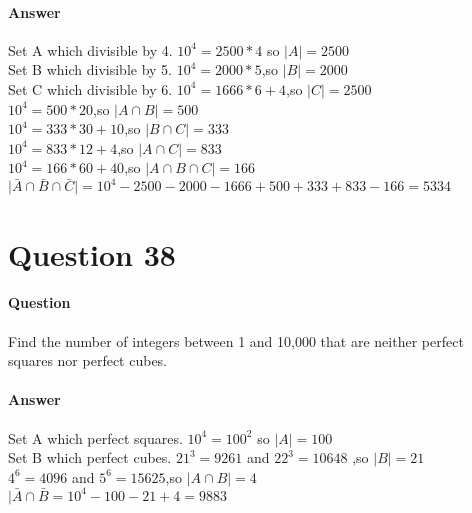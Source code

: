 \documentclass[UTF8]{article}
\begin{document}
\paragraph{Answer}
Set A which divisible by 4. $10^{4} = 2500 * 4 $ so $\vert A \vert = 2500$ \\
Set B which divisible by 5. $10^{4} = 2000 * 5 $,so $\vert B \vert = 2000$ \\
Set C which divisible by 6. $10^{4} = 1666 * 6 + 4$,so $\vert C \vert = 2500$ \\
$10^{4} = 500 * 20$,so $\vert A \cap B \vert = 500$ \\
$10^{4} = 333 * 30 + 10$,so $\vert B \cap C \vert = 333$ \\
$10^{4} = 833 * 12 + 4$,so $\vert A \cap C \vert = 833$ \\
$10^{4} = 166 * 60 + 40$,so $\vert A \cap B \cap C \vert = 166$ \\
$\vert \bar{A} \cap \bar{B} \cap \bar{C}\vert = 10^{4} - 2500 - 2000 - 1666 + 500 + 333 + 833 - 166 = 5334$
\section{Question 38}
\paragraph{Question}
Find the number of integers between 1 and 10,000 that are neither perfect squares nor perfect cubes.
\paragraph{Answer}
Set A which perfect squares. $10^{4} = 100^{2} $ so $\vert A \vert = 100$ \\
Set B which perfect cubes. $21^{3} = 9261$ and $22^{3} = 10648$ ,so $\vert B \vert = 21$ \\
$4^{6} = 4096$ and $5^{6} = 15625$,so $\vert A \cap B \vert = 4$ \\
$\vert \bar{A} \cap \bar{B} = 10^{4} - 100 -21 +4 = 9883$
\end{document}
